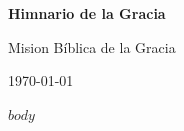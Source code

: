 \documentclass[14pt,letterpaper,twocolumn]{extarticle}
\begin{document}
\begin{titlepage}
    \centering
    \vspace*{2cm}
    {\Huge\bfseries Himnario de la Gracia\par}
    \vspace{1cm}
    {\Large Mision Bíblica de la Gracia\par}
    \vfill
    {\large \today\par}
\end{titlepage}

\newpage

$body$
\end{document}
